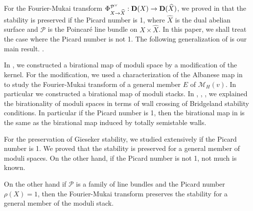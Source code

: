 \documentclass[10pt]{amsart}
\def\cal{\mathcal}
\newenvironment{NB}{
\color{red}{\bf NB}. \footnotesize 
}{}
\numberwithin{equation}{section}
\theoremstyle{plain}
\theoremstyle{definition}
\theoremstyle{remark}
\begin{document}
For the Fourier-Mukai transform
$\Phi_{X \to \widehat{X}}^{{\cal P}^{\vee}}:{\bf D}(X) \to {\bf D}(\widehat{X})$,
we proved in \cite{Y:Stability}
that the stability is preserved if the Picard number is 1, where
$\widehat{X}$ is the dual abelian surface and
${\cal P}$ is the Poincar\'{e} line bundle on $X \times \widehat{X}$.
In this paper, we shall treat the case where the Picard number is not 1.
The following generalization of \cite[Thm. 3.14]{Y:Stability} is our main result.
\begin{NB}
In \cite{Y:abel},
we constructed a birational map of moduli space by a modification of the kernel.
For the modification, we used a characterization of the Albanese map in \cite{Y:7}
to study the Fourier-Mukai transform of a general member $E$ of ${\cal M}_H(v)$.
In particular we constructed a birational map of moduli stacks.
In \cite{MYY:2018}, \cite{YY2}, \cite{Y}, we explained the birationality of
moduli spaces in terms of wall crossing of Bridgeland stability conditions.
In particular if the Picard number is 1, then the birational map in \cite{Y:abel} is the same 
as the birational map induced by totally semistable walls.

For the preservation of Gieseker stability, we studied extensively if the Picard number is 1.
We proved that the stability is preserved for a general member of
moduli spaces.
On the other hand, if the Picard number is not 1,
not much is known. 



On the other hand if ${\cal P}$ is a family of line bundles and the Picard number $\rho(X)=1$,
then the Fourier-Mukai transform preserves the stability for a general member of the moduli stack.





\end{NB}
%
\end{document}
